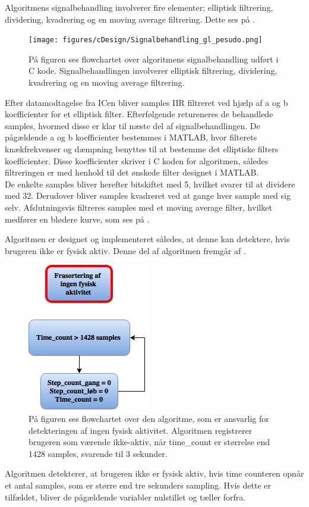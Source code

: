 Algoritmens signalbehandling involverer fire elementer; elliptisk filtrering, dividering, kvadrering og en moving average filtrering. Dette ses på .
\begin{figure}[H]
	\centering
	\texttt{[image: figures/cDesign/Signalbehandling\_gl\_pesudo.png]}
	\caption{På figuren ses flowchartet over algoritmens signalbehandling udført i C kode. Signalbehandlingen involverer elliptisk filtrering, dividering, kvadrering og en moving average filtrering.}
	\label{fig:signalbehandling_g_l}
\end{figure}\vspace{-0.25cm}
Efter datamodtagelse fra ICen bliver samples IIR filtreret ved hjælp af a og b koefficienter for et elliptisk filter. Efterfølgende retureneres de behandlede samples, hvormed disse er klar til næste del af signalbehandlingen. De pågældende a og b koefficienter bestemmes i MATLAB, hvor filterets knækfrekvenser og dæmpning benyttes til at bestemme det elliptiske filters koefficienter. Disse koefficienter skriver i C koden for algoritmen, således filtreringen er med henhold til det ønskede filter designet i MATLAB.\\
De enkelte samples bliver herefter bitskiftet med 5, hvilket svarer til at dividere med 32. Derudover bliver samples kvadreret ved at gange hver sample med sig selv. Afslutningsvis filtreres samples med et moving average filter, hvilket medfører en blødere kurve, som ses på .

Algoritmen er designet og implementeret således, at denne kan detektere, hvis brugeren ikke er fysisk aktiv. Denne del af algoritmen fremgår af .
\begin{figure}[H]
	\centering
	\includegraphics[scale=0.6]{figures/cDesign/ingen_aktivitet_gl_pseudo.png}
	\caption{På figuren ses flowchartet over den algoritme, som er ansvarlig for detekteringen af ingen fysisk aktivitet. Algoritmen registrerer brugeren som værende ikke-aktiv, når time\_count er størrelse end 1428 samples, svarende til 3 sekunder.}
	\label{fig:ingen_ak_pseudo}
\end{figure}\vspace{-0.25cm}
Algoritmen detekterer, at brugeren ikke er fysisk aktiv, hvis time counteren opnår et antal samples, som er større end tre sekunders sampling. Hvis dette er tilfældet, bliver de pågældende variabler nulstillet og tæller forfra.

